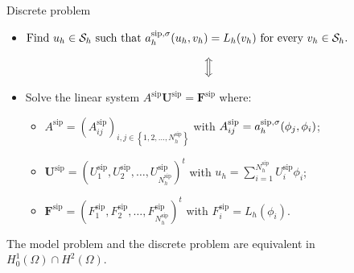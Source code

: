\begin{frame}{Discrete problem}

\begin{itemize}
\item $\text{Find }u_h\in\mathcal{S}_h\text{ such that }a_h^{\text{sip},\sigma}(u_h,v_h)=L_h(v_h)\text{ for every }v_h\in\mathcal{S}_h.$
\end{itemize}
\vspace*{0.1cm}
$$\Big{\Updownarrow}$$
\vspace*{-0.3cm}
\begin{itemize}
\item Solve the linear system $A^{\text{sip}}\mathbf{U}^{\text{sip}}=\mathbf{F}^{\text{sip}}$ where:
\vspace*{0.3cm}
\begin{itemize}
	\item $A^{\text{sip}}=\left(A_{ij}^{\text{sip}}\right)_{i,j\in\left\{1,2,\ldots,N_h^{\text{sip}}\right\}}$ with $A_{ij}^{\text{sip}}=a_h^{\text{sip},\sigma}(\phi_j,\phi_i)$;
	\item $\mathbf{U}^{\text{sip}}=\left(U_1^{\text{sip}},U_2^{\text{sip}},\ldots,U_{N_h^{\text{sip}}}^{\text{sip}}\right)^t$ with $u_h=\displaystyle\sum_{i=1}^{N_h^{\text{sip}}}U_i^{\text{sip}}\phi_i$;
	\item $\mathbf{F}^{\text{sip}}=\left(F_1^{\text{sip}},F_2^{\text{sip}},\ldots,F_{N_h^{\text{sip}}}^{\text{sip}}\right)^t$ with $F_i^{\text{sip}}=L_h(\phi_i)$.
\end{itemize}
\end{itemize}

\vspace*{0.3cm}
The model problem and the discrete problem are \alert{equivalent} in $H_0^1(\Omega)\cap H^2(\Omega)$.

\end{frame}


